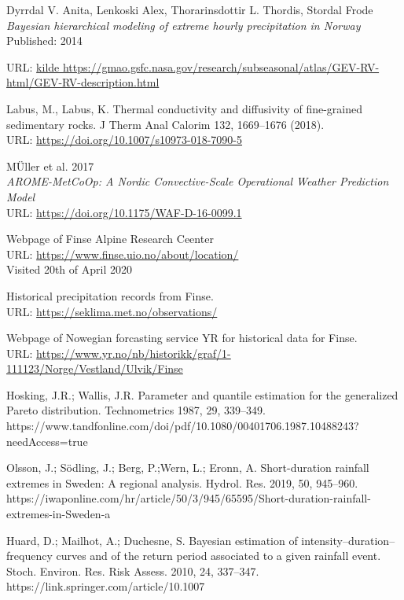\documentclass[12pt]{article}
\begin{document}
{\begin{thebibliography}{9}
Dyrrdal V. Anita, Lenkoski Alex, Thorarinsdottir L. Thordis, Stordal Frode
\textit{Bayesian hierarchical modeling of extreme hourly precipitation in Norway}
Published: 2014

URL: \url{kilde https://gmao.gsfc.nasa.gov/research/subseasonal/atlas/GEV-RV-html/GEV-RV-description.html}

Labus, M., Labus, K. Thermal conductivity and diffusivity of fine-grained sedimentary rocks. J Therm Anal Calorim 132, 1669–1676 (2018). \\
URL: \url{https://doi.org/10.1007/s10973-018-7090-5}

MÜller et al. 2017\\
\textit{AROME-MetCoOp: A Nordic Convective-Scale Operational
Weather Prediction Model}\\
URL: \url{https://doi.org/10.1175/WAF-D-16-0099.1}

Webpage of Finse Alpine Research Ceenter\\
URL: \url{https://www.finse.uio.no/about/location/}\\
Visited 20th of April 2020

Historical precipitation records from Finse.\\
URL: \url{https://seklima.met.no/observations/}

Webpage of Nowegian forcasting service YR for historical data for Finse.\\
URL: \url{https://www.yr.no/nb/historikk/graf/1-111123/Norge/Vestland/Ulvik/Finse}

Hosking, J.R.; Wallis, J.R. Parameter and quantile estimation for the generalized Pareto distribution.
Technometrics 1987, 29, 339–349.
https://www.tandfonline.com/doi/pdf/10.1080/00401706.1987.10488243?needAccess=true

Olsson, J.; Södling, J.; Berg, P.;Wern, L.; Eronn, A. Short-duration rainfall extremes in Sweden: A regional
analysis. Hydrol. Res. 2019, 50, 945–960.
https://iwaponline.com/hr/article/50/3/945/65595/Short-duration-rainfall-extremes-in-Sweden-a

Huard, D.; Mailhot, A.; Duchesne, S. Bayesian estimation of intensity–duration–frequency curves and of
the return period associated to a given rainfall event. Stoch. Environ. Res. Risk Assess. 2010, 24, 337–347.
https://link.springer.com/article/10.1007%


\end{thebibliography}}
\end{document}
